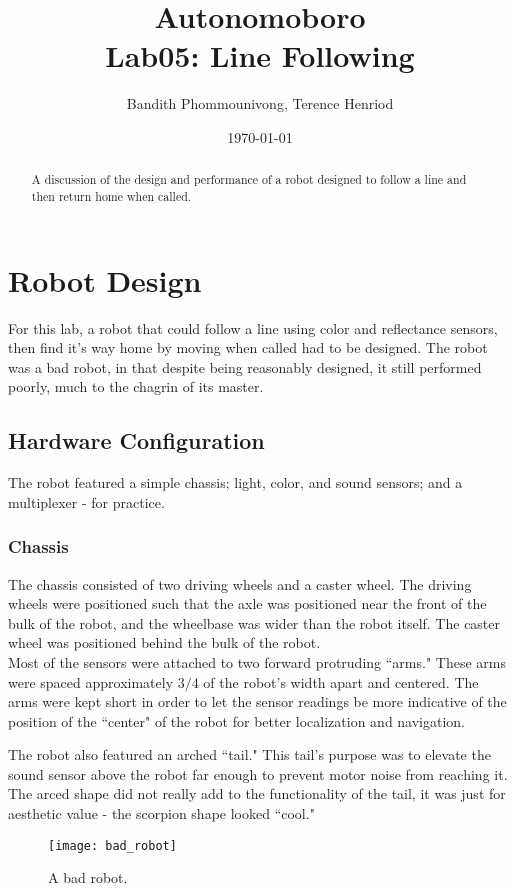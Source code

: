 \documentclass{article}
\title{Autonomoboro \\ Lab05: Line Following}
\author{Bandith Phommounivong, Terence Henriod}
\date{\today}
\begin{document}
\maketitle

\begin{abstract}
A discussion of the design and performance of a robot designed to follow a line and then return home when called.
\end{abstract}

\newpage
\section{Robot Design}
For this lab, a robot that could follow a line using color and reflectance sensors, then find it's way home by moving when called had to be designed. The robot was a bad robot, in that despite being reasonably designed, it still performed poorly, much to the chagrin of its master.

\subsection{Hardware Configuration}
The robot featured a simple chassis; light, color, and sound sensors; and a multiplexer - for practice.

\subsubsection{Chassis}
The chassis consisted of two driving wheels and a caster wheel. The driving wheels were positioned such that the axle was positioned near the front of the bulk of the robot, and the wheelbase was wider than the robot itself. The caster wheel was positioned behind the bulk of the robot. \\

Most of the sensors were attached to two forward protruding ``arms." These arms were spaced approximately $3/4$ of the robot's width apart and centered. The arms were kept short in order to let the sensor readings be more indicative of the position of the ``center" of the robot for better localization and navigation.

The robot also featured an arched ``tail." This tail's purpose was to elevate the sound sensor above the robot far enough to prevent motor noise from reaching it. The arced shape did not really add to the functionality of the tail, it was just for aesthetic value - the scorpion shape looked ``cool."

	\begin{figure}[h]
	\centering
	\texttt{[image: bad\_robot]}
	\caption{A bad robot.}
	\label{fig:bad_robot}
	\end{figure}
\end{document}
